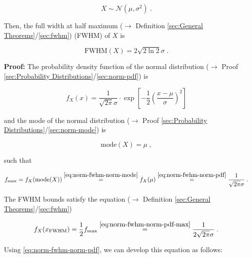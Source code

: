 \documentclass[a4paper,12pt,twoside]{book}
\begin{document}
\begin{equation} \label{eq:norm-fwhm-norm}
X \sim \mathcal{N}(\mu, \sigma^2) \; .
\end{equation}

Then, the full width at half maximum ($\rightarrow$ Definition \ref{sec:General Theorems}/\ref{sec:fwhm}) (FWHM) of $X$ is

\begin{equation} \label{eq:norm-fwhm-norm-fwhm}
\mathrm{FWHM}(X) = 2 \sqrt{2 \ln 2} \sigma \; .
\end{equation}


\vspace{1em}
\textbf{Proof:} The probability density function of the normal distribution ($\rightarrow$ Proof \ref{sec:Probability Distributions}/\ref{sec:norm-pdf}) is

\begin{equation} \label{eq:norm-fwhm-norm-pdf}
f_X(x) = \frac{1}{\sqrt{2 \pi} \sigma} \cdot \exp \left[ -\frac{1}{2} \left( \frac{x-\mu}{\sigma} \right)^2 \right]
\end{equation}

and the mode of the normal distribution ($\rightarrow$ Proof \ref{sec:Probability Distributions}/\ref{sec:norm-mode}) is

\begin{equation} \label{eq:norm-fwhm-norm-mode}
\mathrm{mode}(X) = \mu \; ,
\end{equation}

such that

\begin{equation} \label{eq:norm-fwhm-norm-pdf-max}
f_\mathrm{max} = f_X(\mathrm{mode}(X)) \overset{\eqref{eq:norm-fwhm-norm-mode}}{=} f_X(\mu) \overset{\eqref{eq:norm-fwhm-norm-pdf}}{=} \frac{1}{\sqrt{2 \pi} \sigma} \; .
\end{equation}

The FWHM bounds satisfy the equation ($\rightarrow$ Definition \ref{sec:General Theorems}/\ref{sec:fwhm})

\begin{equation} \label{eq:norm-fwhm-x-FHWM}
f_X(x_\mathrm{FWHM}) = \frac{1}{2} f_\mathrm{max} \overset{\eqref{eq:norm-fwhm-norm-pdf-max}}{=} \frac{1}{2 \sqrt{2 \pi} \sigma} \; .
\end{equation}

Using \eqref{eq:norm-fwhm-norm-pdf}, we can develop this equation as follows:
\end{document}
